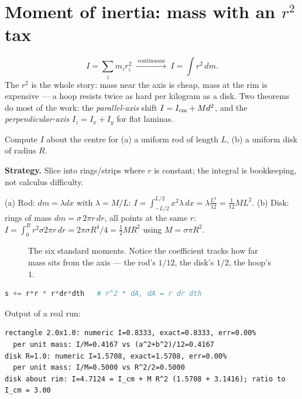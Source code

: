 \section{Moment of inertia: mass with an $r^{2}$ tax}\label{sec:rot-i}

\begin{equation}
  I=\sum_i m_ir_i^{2}\;\xrightarrow{\ \text{continuous}\ }\;
  I=\int r^{2}\,dm.\label{eq:moi}
\end{equation}
The $r^{2}$ is the whole story: mass near the axis is cheap, mass at the
rim is expensive --- a hoop resists twice as hard per kilogram as a disk.
Two theorems do most of the work: the \emph{parallel-axis} shift
$I=I_{\rm cm}+Md^{2}$, and the \emph{perpendicular-axis}
$I_z=I_x+I_y$ for flat laminas.

\begin{example}\label{ex:moi}
Compute $I$ about the centre for (a) a uniform rod of length $L$, (b) a
uniform disk of radius $R$.
\par\smallskip
\textbf{Strategy.} Slice into rings/strips where $r$ is constant; the
integral is bookkeeping, not calculus difficulty.
\begin{solution}
(a) Rod: $dm=\lambda dx$ with $\lambda=M/L$:
$I=\int_{-L/2}^{L/2}x^{2}\lambda\,dx=\lambda\frac{L^{3}}{12}
=\frac{1}{12}ML^{2}$.
(b) Disk: rings of mass $dm=\sigma\,2\pi r\,dr$, all points at the same
$r$: $I=\int_0^{R}r^{2}\sigma2\pi r\,dr
=2\pi\sigma R^{4}/4=\frac{1}{2}MR^{2}$ using
$M=\sigma\pi R^{2}$. \checkmark
\end{solution}
\end{example}

\begin{figure}[htbp]\centering

\caption{The six standard moments. Notice the coefficient tracks how far
mass sits from the axis --- the rod's $1/12$, the disk's $1/2$, the
hoop's $1$.}
\label{fig:itable}
\end{figure}

\begin{lstlisting}[language=Python,caption={\texttt{code/ch05\_inertia\_integrator.py} --- grid quadrature vs analytic $I$; the parallel-axis term on display.},label={lst:moi}]
s += r*r * r*dr*dth   # r^2 * dA, dA = r dr dth
\end{lstlisting}

Output of a real run:
\begin{lstlisting}[numbers=none]
rectangle 2.0x1.0: numeric I=0.8333, exact=0.8333, err=0.00%
  per unit mass: I/M=0.4167 vs (a^2+b^2)/12=0.4167
disk R=1.0: numeric I=1.5708, exact=1.5708, err=0.00%
  per unit mass: I/M=0.5000 vs R^2/2=0.5000
disk about rim: I=4.7124 = I_cm + M R^2 (1.5708 + 3.1416); ratio to I_cm = 3.00
\end{lstlisting}

